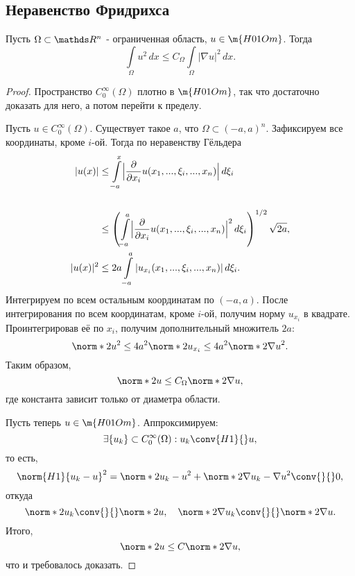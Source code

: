 
\subsection{Неравенство Фридрихса}
\begin{theorem} Пусть $\Omega \subset \real^n$ - ограниченная область, $u \in \m{H01Om}$. Тогда
$$ \int \limits_\Omega u^2 \, dx \leq C_\Omega \int \limits_\Omega |\nabla u|^2 \, dx.$$
\end{theorem}
\begin{proof} Пространство $C_0^\infty(\Omega)$ плотно в $\m{H01Om}$, так что достаточно доказать для него, а потом перейти к пределу.

Пусть $u \in C_0^\infty(\Omega)$. Существует такое $a$, что $\Omega \subset (-a,a)^n.$ Зафиксируем все координаты, кроме $i$-ой. Тогда по неравенству Гёльдера
\begin{align*}
|u(x)| &\leq \int \limits_{-a}^x \Bigl\lvert \frac{\partial}{\partial x_i} u(x_1, ..., \xi_i, ..., x_n) \Bigr\rvert \, d \xi_i \\ \\
& \leq \left( \int \limits_{-a}^a \Bigl\lvert \frac{\partial}{\partial x_i} u(x_1, ..., \xi_i, ..., x_n)  \Bigr\rvert^2 \, d\xi_i\right)^{1/2} \sqrt{2a},\\
|u(x)|^2 &\leq 2a \int \limits_{-a}^a | u_{x_i} (x_1, ..., \xi_i, ..., x_n) | \, d\xi_i.
\end{align*}
Интегрируем по всем остальным координатам по $(-a, a)$. После интегрирования по всем координатам, кроме $i$-ой, получим норму $u_{x_i}$ в квадрате. Проинтегрировав её по $x_i$, получим дополнительный множитель $2a$:
$$ \norm*{2}{u}^2 \leq 4a^2 \norm*{2}{u_{x_i}} \leq 4a^2 \norm*{2}{\nabla u}^2.$$
Таким образом,
$$\norm*{2}{u} \leq C_\Omega \norm*{2}{\nabla u},$$
где константа зависит только от диаметра области.

Пусть теперь $u \in \m{H01Om}$. Аппроксимируем:
$$ \exists \{u_k \} \subset C_0^\infty(\Omega) : u_k  \conv{H1}{} u,$$
то есть,
$$ \norm{H1}{u_k - u}^2 = \norm*{2}{u_k - u}^2 + \norm*{2}{\nabla u_k - \nabla u}^2 \conv{}{} 0,$$
откуда
$$\norm*{2}{u_k} \conv{}{} \norm*{2}{u}, \quad \norm*{2}{\nabla u_k} \conv{}{} \norm*{2}{\nabla u}.$$
Итого,
$$ \norm*{2}{u} \leq C \norm*{2}{\nabla u},$$
что и требовалось доказать.
\end{proof}

